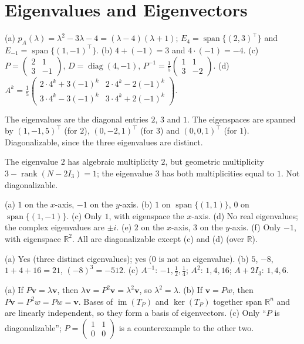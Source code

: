 \documentclass[11pt]{article}
\DeclareMathOperator{\im}{im}
\DeclareMathOperator{\rank}{rank}
\DeclareMathOperator{\Span}{span}
\DeclareMathOperator{\diag}{diag}
\begin{document}
\section*{Eigenvalues and Eigenvectors}

\begin{description}[leftmargin=0pt, itemsep=0.3em]
    \item[\ref{pr:eig2}.] (a) $p_A(\lambda) = \lambda^2 - 3\lambda - 4 = (\lambda - 4)(\lambda + 1)$; $E_4 = \Span\{(2, 3)^\top\}$ and $E_{-1} = \Span\{(1, -1)^\top\}$. (b) $4 + (-1) = 3$ and $4 \cdot (-1) = -4$. (c) $P = \begin{pmatrix} 2 & 1 \\ 3 & -1 \end{pmatrix}$, $D = \diag(4, -1)$, $P^{-1} = \frac{1}{5}\begin{pmatrix} 1 & 1 \\ 3 & -2 \end{pmatrix}$. (d) $A^k = \frac{1}{5}\begin{pmatrix} 2 \cdot 4^k + 3(-1)^k & 2 \cdot 4^k - 2(-1)^k \\ 3 \cdot 4^k - 3(-1)^k & 3 \cdot 4^k + 2(-1)^k \end{pmatrix}$.
    \item[\ref{pr:eig-triangular}.] The eigenvalues are the diagonal entries $2$, $3$ and $1$. The eigenspaces are spanned by $(1, -1, 5)^\top$ (for $2$), $(0, -2, 1)^\top$ (for $3$) and $(0, 0, 1)^\top$ (for $1$). Diagonalizable, since the three eigenvalues are distinct.
    \item[\ref{pr:eig-defective}.] The eigenvalue $2$ has algebraic multiplicity $2$, but geometric multiplicity $3 - \rank(N - 2I_3) = 1$; the eigenvalue $3$ has both multiplicities equal to $1$. Not diagonalizable.
    \item[\ref{pr:eig-geometric}.] (a) $1$ on the $x$-axis, $-1$ on the $y$-axis. (b) $1$ on $\Span\{(1, 1)\}$, $0$ on $\Span\{(1, -1)\}$. (c) Only $1$, with eigenspace the $x$-axis. (d) No real eigenvalues; the complex eigenvalues are $\pm i$. (e) $2$ on the $x$-axis, $3$ on the $y$-axis. (f) Only $-1$, with eigenspace $\mathbb{R}^2$. All are diagonalizable except (c) and (d) (over $\mathbb{R}$).
    \item[\ref{pr:eig-gre}.] (a) Yes (three distinct eigenvalues); yes ($0$ is not an eigenvalue). (b) $5$, $-8$, $1 + 4 + 16 = 21$, $(-8)^3 = -512$. (c) $A^{-1}$: $-1, \frac{1}{2}, \frac{1}{4}$; $A^2$: $1, 4, 16$; $A + 2I_3$: $1, 4, 6$.
    \item[\ref{pr:eig-idempotent}.] (a) If $P\mathbf{v} = \lambda \mathbf{v}$, then $\lambda \mathbf{v} = P^2 \mathbf{v} = \lambda^2 \mathbf{v}$, so $\lambda^2 = \lambda$. (b) If $\mathbf{v} = Pw$, then $P\mathbf{v} = P^2w = Pw = \mathbf{v}$. Bases of $\im(T_P)$ and $\ker(T_P)$ together span $\mathbb{R}^n$ and are linearly independent, so they form a basis of eigenvectors. (c) Only ``$P$ is diagonalizable''; $P = \begin{pmatrix} 1 & 1 \\ 0 & 0 \end{pmatrix}$ is a counterexample to the other two.

\end{description}
\end{document}
